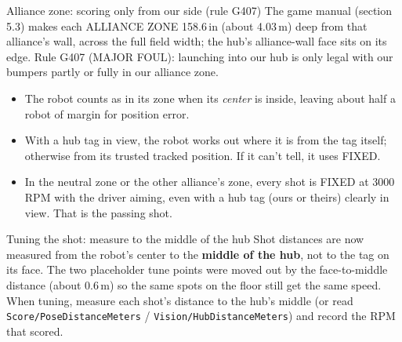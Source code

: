 \documentclass[11pt]{article}
\newcommand{\dash}[1]{\texttt{#1}}
\begin{document}
\begin{drivenote}{Alliance zone: scoring only from our side (rule G407)}
The game manual (section 5.3) makes each ALLIANCE ZONE 158.6\,in (about 4.03\,m) deep from that
alliance's wall, across the full field width; the hub's alliance-wall face sits on its edge.
Rule G407 (MAJOR FOUL): launching into our hub is only legal with our bumpers partly or fully in
our alliance zone.
\begin{itemize}[leftmargin=*]
  \item The robot counts as in its zone when its \emph{center} is inside, leaving about half a robot
    of margin for position error.
  \item With a hub tag in view, the robot works out where it is from the tag itself; otherwise from
    its trusted tracked position. If it can't tell, it uses FIXED.
  \item In the neutral zone or the other alliance's zone, every shot is FIXED at 3000 RPM with the
    driver aiming, even with a hub tag (ours or theirs) clearly in view. That is the passing shot.
\end{itemize}
\end{drivenote}

\medskip
\begin{drivenote}{Tuning the shot: measure to the middle of the hub}
Shot distances are now measured from the robot's center to the \textbf{middle of the hub}, not to
the tag on its face. The two placeholder tune points were moved out by the face-to-middle distance
(about 0.6\,m) so the same spots on the floor still get the same speed. When tuning, measure each
shot's distance to the hub's middle (or read \dash{Score/PoseDistanceMeters} /
\dash{Vision/HubDistanceMeters}) and record the RPM that scored.
\end{drivenote}
\end{document}
